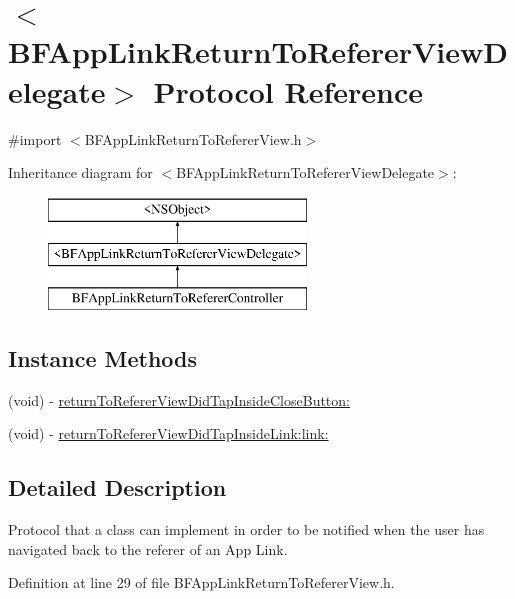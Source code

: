\hypertarget{protocol_b_f_app_link_return_to_referer_view_delegate-p}{}\section{$<$B\+F\+App\+Link\+Return\+To\+Referer\+View\+Delegate$>$ Protocol Reference}
\label{protocol_b_f_app_link_return_to_referer_view_delegate-p}


{\ttfamily \#import $<$B\+F\+App\+Link\+Return\+To\+Referer\+View.\+h$>$}

Inheritance diagram for $<$B\+F\+App\+Link\+Return\+To\+Referer\+View\+Delegate$>$\+:\begin{figure}[H]
\begin{center}
\leavevmode
\includegraphics[height=3.000000cm]{protocol_b_f_app_link_return_to_referer_view_delegate-p}
\end{center}
\end{figure}
\subsection*{Instance Methods}
\begin{DoxyCompactItemize}
\item 
(void) -\/ \hyperlink{protocol_b_f_app_link_return_to_referer_view_delegate-p_ac587dae3654f9804b1ff307e785f439f}{return\+To\+Referer\+View\+Did\+Tap\+Inside\+Close\+Button\+:}
\item 
(void) -\/ \hyperlink{protocol_b_f_app_link_return_to_referer_view_delegate-p_a6e70cea27cddbc4bf47e64ca52213000}{return\+To\+Referer\+View\+Did\+Tap\+Inside\+Link\+:link\+:}
\end{DoxyCompactItemize}


\subsection{Detailed Description}
Protocol that a class can implement in order to be notified when the user has navigated back to the referer of an App Link. 

Definition at line 29 of file B\+F\+App\+Link\+Return\+To\+Referer\+View.\+h.



